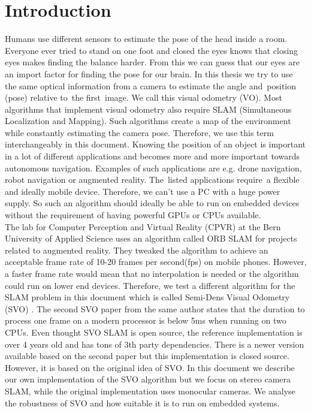 \documentclass[11pt,a4paper,titlepage,oneside]{report}
\begin{document}
\tableofcontents

\chapter{Introduction}

Humans use different sensors to estimate the pose of the head inside a room. Everyone ever tried to stand on one foot and closed the eyes knows that closing eyes makes finding the balance harder. From this we can guess that our eyes are an import factor for finding the pose for our brain. In this thesis we try to use the same optical information from a camera to estimate the angle and position (pose) relative to the first image. We call this visual odometry (VO). Most algorithms that implement visual odometry also require SLAM (Simultaneous Localization and Mapping). Such algorithms create a map of the environment while constantly estimating the camera pose. Therefore, we use this term interchangeably in this document. Knowing the position of an object is important in a lot of different applications and becomes more and more important towards autonomous navigation. Examples of such applications are e.g. drone navigation, robot navigation or augmented reality. The listed applications require a flexible and ideally mobile device. Therefore, we can’t use a PC with a huge power supply. So such an algorithm should ideally be able to run on embedded devices without the requirement of having powerful GPUs or CPUs available.\\
The lab for Computer Perception and Virtual Reality (CPVR) at the Bern University of Applied Science uses an algorithm called ORB SLAM \cite{orbslam} for projects related to augmented reality. They tweaked the algorithm to achieve an acceptable frame rate of 10-20 frames per second(fps) on mobile phones. However, a faster frame rate would mean that no interpolation is needed or the algorithm could run on lower end devices. Therefore, we test a different algorithm for the SLAM problem in this document which is called Semi-Dens Visual Odometry (SVO) \cite{svo}. The second SVO paper \cite{svo2} from the same author states that the duration to process one frame on a modern processor is below 5ms when running on two CPUs. Even thought SVO SLAM is open source, the reference implementation is over 4 years old and has tons of 3th party dependencies. There is a newer version available based on the second paper but this implementation is closed source. However, it is based on the original idea of SVO. In this document we describe our own implementation of the SVO algorithm but we focus on stereo camera SLAM, while the original implementation uses monocular cameras. We analyse the robustness of SVO and how suitable it is to run on embedded systems.
\end{document}
